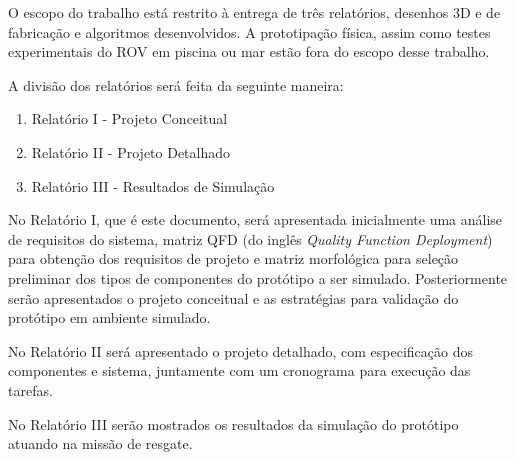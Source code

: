 O escopo do trabalho está restrito à entrega de três relatórios, desenhos 3D e de fabricação e algoritmos desenvolvidos. A prototipação física, assim como testes experimentais do ROV em piscina ou mar estão fora do escopo desse trabalho.

A divisão dos relatórios será feita da seguinte maneira:
\vspace{1.5mm}

\begin{enumerate}
	\item Relatório I - Projeto Conceitual
	\item Relatório II - Projeto Detalhado
	\item Relatório III - Resultados de Simulação
\end{enumerate}
\vspace{1.5mm}
 
No Relatório I, que é este documento, será apresentada inicialmente uma análise de requisitos do sistema, matriz QFD (do inglês \textit{Quality Function Deployment}) para obtenção dos requisitos de projeto e matriz morfológica para seleção preliminar dos tipos de componentes do protótipo a ser simulado. Posteriormente serão apresentados o projeto conceitual e as estratégias para validação do protótipo em ambiente simulado.

No Relatório II será apresentado o projeto detalhado, com especificação dos componentes e sistema, juntamente com um cronograma para execução das tarefas.

No Relatório III serão mostrados os resultados da simulação do protótipo atuando na missão de resgate.